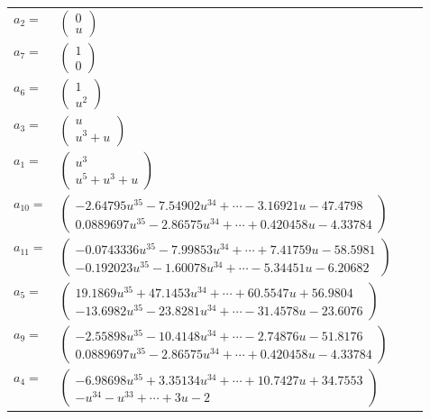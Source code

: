 \documentclass[1p]{elsarticle_modified}
\theoremstyle{definition}
\begin{document}
\begin{tabular}{m{7pt} m{180pt} m{7pt} m{180pt} }
\flushright $a_{2}=$&$\begin{pmatrix}0\\u\end{pmatrix}$ \\
\flushright $a_{7}=$&$\begin{pmatrix}1\\0\end{pmatrix}$ \\
\flushright $a_{6}=$&$\begin{pmatrix}1\\u^2\end{pmatrix}$ \\
\flushright $a_{3}=$&$\begin{pmatrix}u\\u^3+u\end{pmatrix}$ \\
\flushright $a_{1}=$&$\begin{pmatrix}u^3\\u^5+u^3+u\end{pmatrix}$ \\
\flushright $a_{10}=$&$\begin{pmatrix}-2.64795 u^{35}-7.54902 u^{34}+\cdots-3.16921 u-47.4798\\0.0889697 u^{35}-2.86575 u^{34}+\cdots+0.420458 u-4.33784\end{pmatrix}$ \\
\flushright $a_{11}=$&$\begin{pmatrix}-0.0743336 u^{35}-7.99853 u^{34}+\cdots+7.41759 u-58.5981\\-0.192023 u^{35}-1.60078 u^{34}+\cdots-5.34451 u-6.20682\end{pmatrix}$ \\
\flushright $a_{5}=$&$\begin{pmatrix}19.1869 u^{35}+47.1453 u^{34}+\cdots+60.5547 u+56.9804\\-13.6982 u^{35}-23.8281 u^{34}+\cdots-31.4578 u-23.6076\end{pmatrix}$ \\
\flushright $a_{9}=$&$\begin{pmatrix}-2.55898 u^{35}-10.4148 u^{34}+\cdots-2.74876 u-51.8176\\0.0889697 u^{35}-2.86575 u^{34}+\cdots+0.420458 u-4.33784\end{pmatrix}$ \\
\flushright $a_{4}=$&$\begin{pmatrix}-6.98698 u^{35}+3.35134 u^{34}+\cdots+10.7427 u+34.7553\\- u^{34}- u^{33}+\cdots+3 u-2\end{pmatrix}$ \\

\end{tabular}
\end{document}
